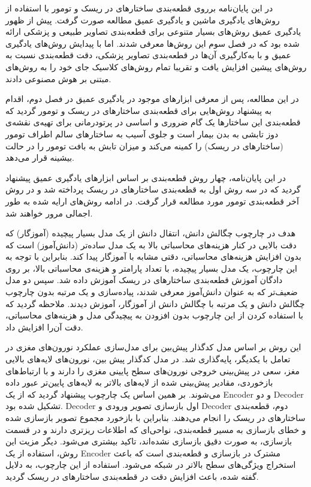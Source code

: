 

در این پایان‌نامه برروی قطعه‌بندی ساختارهای در ریسک و تومور با استفاده از روش‌های یادگیری ماشین و یادگیری عمیق مطالعه صورت گرفت. پیش از ظهور یادگیری عمیق روش‌های بسیار متنوعی برای قطعه‌بندی تصاویر طبیعی و پزشکی ارائه شده بود که در فصل سوم این روش‌ها معرفی شدند. اما با پیدایش روش‌های یادگیری عمیق و با به‌کارگیری آن‌ها در قطعه‌بندی تصاویر پزشکی، دقت قطعه‌بندی نسبت به روش‌های پیشین افزایش یافت و تقریبا تمام روش‌های کلاسیک جای خود را به روش‌های مبتنی بر هوش مصنوعی دادند.

در این مطالعه‌، پس از معرفی ابزارهای موجود در یادگیری عمیق در فصل دوم، اقدام به پیشنهاد روش‌هایی برای قطعه‌بندی ساختارهای در ریسک و تومور گردید که قطعه‌بندی‌ این ساختارها یک گام ضروری و اساسی در پرتودرمانی برای تهیه‌ی نقشه‌ی دوز تابشی به بدن بیمار است و جلوی آسیب به ساختارهای سالم اطراف تومور (ساختارهای در ریسک) را کمینه می‌کند و میزان تابش به بافت تومور را در حالت بیشینه قرار می‌دهد.

در این پایان‌نامه، چهار روش قطعه‌بندی بر اساس ابزارهای  یادگیری عمیق پیشنهاد گردید که در سه روش اول به قطعه‌بندی ساختارهای در ریسک پرداخته شد و در روش آخر قطعه‌بندی تومور مورد مطالعه قرار گرفت. در ادامه روش‌های ارایه شده به طور اجمالی مرور خواهند شد.

 هدف در چارچوب چگالش دانش، انتقال دانش از یک مدل بسیار پیچیده (آموزگار) که دقت بالایی در کنار هزینه‌های محاسباتی بالا به یک مدل ساده‌تر (دانش‌آموز) است که بدون افزایش هزینه‌های محاسباتی، دقتی مشابه با آموزگار پیدا کند. بنابراین با توجه به این چارچوب، یک مدل بسیار پیچیده، با تعداد پارامتر و هزینه‌ی محاسباتی بالا، بر روی دادگان آموزش قطعه‌بندی ساختارهای در ریسک آموزش داده شد. سپس دو مدل ضعیف‌تر که به عنوان دانش‌آموز معرفی شدند، پیاده‌سازی و یک مرتبه بدون چارچوب چگالش دانش و یک مرتبه با چگالش دانش از آموزگار، آموزش دیدند. ملاحظه گردید که با استفاده کردن از این چارچوب بدون افزودن به پیچیدگی مدل و هزینه‌های محاسباتی، دقت آن‌را افزایش داد.

 این روش بر اساس مدل کدگذار پیش‌بین برای مدل‌سازی عملکرد نورون‌های مغزی در تعامل با یکدیگر، پایه‌گذاری شد. در مدل کدگذار پیش بین، نورون‌های لایه‌های بالایی مغز، سعی در پیش‌بینی خروجی نورون‌های سطح پایینی مغزی را دارند و با ارتباط‌های بازخوردی، مقادیر پیش‌بینی شده از لایه‌های بالاتر به لایه‌های پایین‌تر عبور داده‌ می‌شوند. بر همین اساس یک چارچوب پیشنهاد گردید که از یک Encoder و دو Decoder تشکیل شده بود. Decoder اول بازسازی تصویر ورودی و Decoder دوم، قطعه‌بندی ساختارهای در ریسک را انجام می‌دهند. بنابراین با بازخورد مجموع تصویر بازسازی شده و خطای بازسازی به مسیر قطعه‌بندی، نواحی‌ای که اطلاعات ریزتری دارند و در قسمت بازسازی، به صورت دقیق بازسازی نشده‌اند، تاکید بیشتری می‌شود. دیگر مزیت این روش، استفاده از یک Encoder مشترک در بازسازی و قطعه‌بندی است که باعث استخراج ویژگی‌های سطح بالاتر در شبکه می‌شود. استفاده از این چارچوب، به دلایل گفته شده، باعث افزایش دقت در قطعه‌بندی ساختارهای در ریسک گردید.

